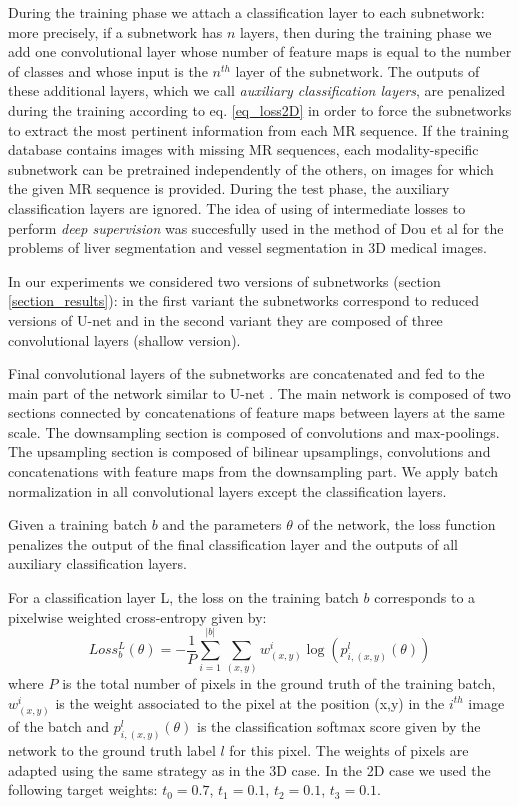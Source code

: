 \documentclass[preprint,12pt]{elsarticle}
\begin{document}
During the training phase we attach a classification layer to each subnetwork: more precisely, if a subnetwork has $n$ layers, then during the training phase we add one convolutional layer whose number of feature maps is equal to the number of classes and whose input is the $n^{th}$ layer of the subnetwork. The outputs of these additional layers, which we call \textit{auxiliary classification layers}, are penalized during the training according to eq. \ref{eq_loss2D} in order to force the subnetworks to extract the most pertinent information from each MR sequence. If the training database contains images with missing MR sequences, each modality-specific subnetwork can be pretrained independently of the others, on images for which the given MR sequence is provided. During the test phase, the auxiliary classification layers are ignored. The idea of using of intermediate losses to perform \textit{deep supervision} was succesfully used in the method of Dou et al \cite{dou20173d} for the problems of liver segmentation and vessel segmentation in 3D medical images.

In our experiments we considered two versions of subnetworks (section \ref{section_results}): in the first variant the subnetworks correspond to reduced versions of U-net and in the second variant they are composed of three convolutional layers (shallow version).

Final convolutional layers of the subnetworks are concatenated and fed to the main part of the network similar to U-net \cite{ronneberger2015u}. The main network is composed of two sections connected by concatenations of feature maps between layers at the same scale. The downsampling section is composed of convolutions and max-poolings. The upsampling section is composed of bilinear upsamplings, convolutions and concatenations with feature maps from the downsampling part. We apply batch normalization \cite{ioffe2015batch} in all convolutional layers except the classification layers. 

Given a training batch $b$ and the parameters $\theta$ of the network, the loss function penalizes the output of the final classification layer and the outputs of all auxiliary classification layers. 

For a classification layer L, the loss on the training batch $b$ corresponds to a pixelwise weighted cross-entropy given by:
\begin{equation}
  Loss_{b}^{L}(\theta)= -\frac{1}{P} \sum_{ i=1}^{|b|} \sum_{ (x,y)} w_{ (x,y)}^i \log(p^l_{i, (x,y)}(\theta))
\end{equation}
where $P$ is the total number of pixels in the ground truth of the training batch, $w_{ (x,y)}^i$ is the weight associated to the pixel at the position (x,y) in the $i^{th}$ image of the batch and $p^l_{i, (x,y)}(\theta)$ is the classification softmax score given by the network to the ground truth label $l$ for this pixel. The weights of pixels are adapted using the same strategy as in the 3D case. In the 2D case we used the following target weights: $t_0=0.7$, $t_1=0.1$, $t_2=0.1$, $t_3=0.1$.
\end{document}
